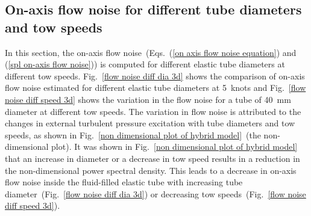 \documentclass[11pt,cleanfoot]{asme2ej}
\begin{document}

\subsection{On-axis flow noise for different tube diameters and tow speeds}
\label{parametric study}

In this section, the on-axis flow noise~(Eqs.~(\ref{on axis flow noise equation}) and (\ref{spl on-axis flow noise})) is computed for different elastic tube diameters at different tow speeds. Fig.~\ref{flow noise diff dia 3d} shows the comparison of on-axis flow noise estimated for different elastic tube diameters at 5~knots and  Fig.~\ref{flow noise diff speed 3d} shows the variation in the flow noise for a tube of 40~mm diameter at different tow speeds. The variation in flow noise is attributed to the changes in external turbulent pressure excitation with tube diameters and tow speeds, as shown in Fig.~\ref{non dimensional plot of hybrid model}~(the non-dimensional plot). It was shown in Fig.~\ref{non dimensional plot of hybrid model} that an increase in diameter or a decrease in tow speed results in a reduction in the non-dimensional power spectral density. This leads to a decrease in on-axis flow noise inside the fluid-filled elastic tube with increasing tube diameter~(Fig.~\ref{flow noise diff dia 3d}) or decreasing tow speeds~(Fig.~\ref{flow noise diff speed 3d}).
\end{document}
